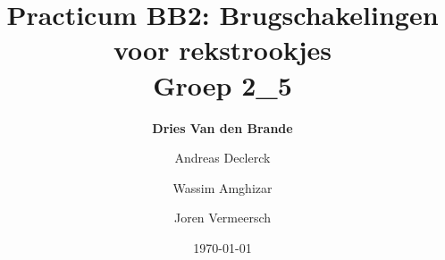 \documentclass[12pt]{article}
\begin{document}
    \title{\textbf{Practicum BB2: Brugschakelingen voor rekstrookjes} \\\small{Groep 2\_5}}
    \author{\textbf{Dries Van den Brande} \and Andreas Declerck \and Wassim Amghizar \and Joren Vermeersch}
    \date{\today}

    \maketitle

    

    

    

    

    

    

    

    

    
\end{document}
